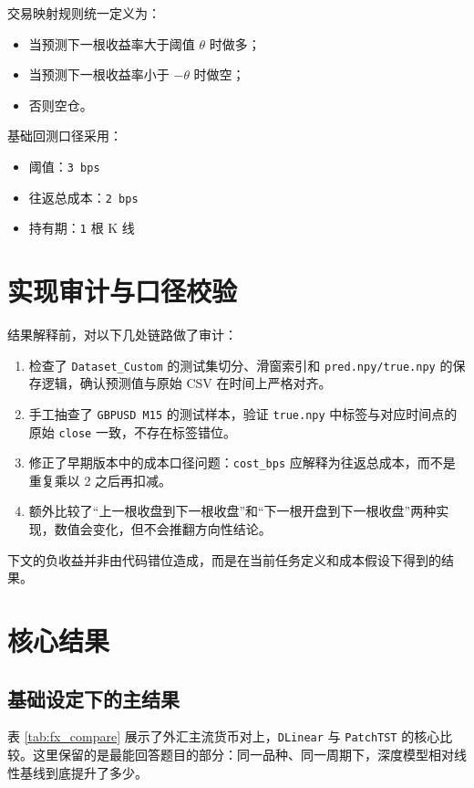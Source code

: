 \documentclass[11pt,a4paper]{ctexart}
\begin{document}
交易映射规则统一定义为：
\begin{itemize}
  \item 当预测下一根收益率大于阈值 $\theta$ 时做多；
  \item 当预测下一根收益率小于 $-\theta$ 时做空；
  \item 否则空仓。
\end{itemize}

基础回测口径采用：
\begin{itemize}
  \item 阈值：\texttt{3 bps}
  \item 往返总成本：\texttt{2 bps}
  \item 持有期：\texttt{1} 根 K 线
\end{itemize}

\section{实现审计与口径校验}

结果解释前，对以下几处链路做了审计：
\begin{enumerate}
  \item 检查了 \texttt{Dataset\_Custom} 的测试集切分、滑窗索引和 \texttt{pred.npy/true.npy} 的保存逻辑，确认预测值与原始 CSV 在时间上严格对齐。
  \item 手工抽查了 \texttt{GBPUSD M15} 的测试样本，验证 \texttt{true.npy} 中标签与对应时间点的原始 \texttt{close} 一致，不存在标签错位。
  \item 修正了早期版本中的成本口径问题：\texttt{cost\_bps} 应解释为往返总成本，而不是重复乘以 2 之后再扣减。
  \item 额外比较了“上一根收盘到下一根收盘”和“下一根开盘到下一根收盘”两种实现，数值会变化，但不会推翻方向性结论。
\end{enumerate}

下文的负收益并非由代码错位造成，而是在当前任务定义和成本假设下得到的结果。

\section{核心结果}

\subsection{基础设定下的主结果}

表 \ref{tab:fx_compare} 展示了外汇主流货币对上，\texttt{DLinear} 与 \texttt{PatchTST} 的核心比较。这里保留的是最能回答题目的部分：同一品种、同一周期下，深度模型相对线性基线到底提升了多少。
\end{document}
